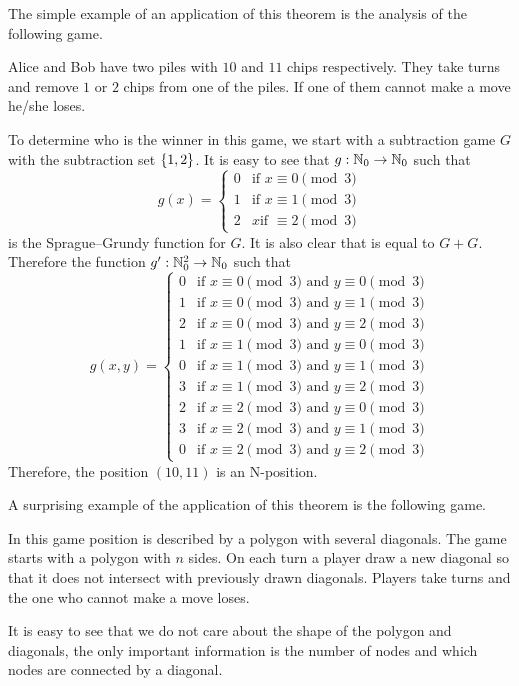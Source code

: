 The simple example of an application of this theorem is the analysis of the
following game.
\begin{game}
\label{game:subtraction-1-2-3-out-of-10-11}
  Alice and Bob have two piles with $10$ and $11$ chips respectively.
  They take turns and remove $1$ or $2$ chips from one of the piles.
  If one of them cannot make a move he/she loses.
\end{game}

To determine who is the winner in this game, we start with a subtraction game
$G$ with the subtraction set $\set{1, 2}$. It is easy to see that 
$g : {\mathbb{N}}_0 \to {\mathbb{N}}_0$ such that
\[
  g(x) =
  \begin{cases}
    0 & \text{if } x \equiv 0 \pmod{3} \\
    1 & \text{if } x \equiv 1 \pmod{3} \\
    2 & x \text{if } \equiv 2 \pmod{3}
  \end{cases}
\]
is the Sprague--Grundy function for $G$. 
It is also clear that  is equal to 
$G + G$. Therefore the function $g' : {\mathbb{N}}_0^2 \to {\mathbb{N}}_0$ such that 
\[
  g(x, y) =
  \begin{cases}
    0 & \text{if } x \equiv 0 \pmod{3} \text{ and } y \equiv 0 \pmod{3}\\
    1 & \text{if } x \equiv 0 \pmod{3} \text{ and } y \equiv 1 \pmod{3}\\
    2 & \text{if } x \equiv 0 \pmod{3} \text{ and } y \equiv 2 \pmod{3}\\
    1 & \text{if } x \equiv 1 \pmod{3} \text{ and } y \equiv 0 \pmod{3}\\
    0 & \text{if } x \equiv 1 \pmod{3} \text{ and } y \equiv 1 \pmod{3}\\
    3 & \text{if } x \equiv 1 \pmod{3} \text{ and } y \equiv 2 \pmod{3}\\
    2 & \text{if } x \equiv 2 \pmod{3} \text{ and } y \equiv 0 \pmod{3}\\
    3 & \text{if } x \equiv 2 \pmod{3} \text{ and } y \equiv 1 \pmod{3}\\
    0 & \text{if } x \equiv 2 \pmod{3} \text{ and } y \equiv 2 \pmod{3}
  \end{cases}
\]
Therefore, the position $(10, 11)$ is an N-position.


A surprising example of the application of this theorem is the following game.
\begin{game}
\label{game:polygon}
  In this game position is described by a polygon with several diagonals. 
  The game starts with a polygon with $n$ sides. On each turn a player draw a
  new diagonal so that it does not intersect with previously drawn diagonals.
  Players take turns and the one who cannot make a move loses.
\end{game}
It is easy to see that we do not care about the shape of the polygon and
diagonals, the only important information is the number of nodes and which nodes
are connected by a diagonal. 

